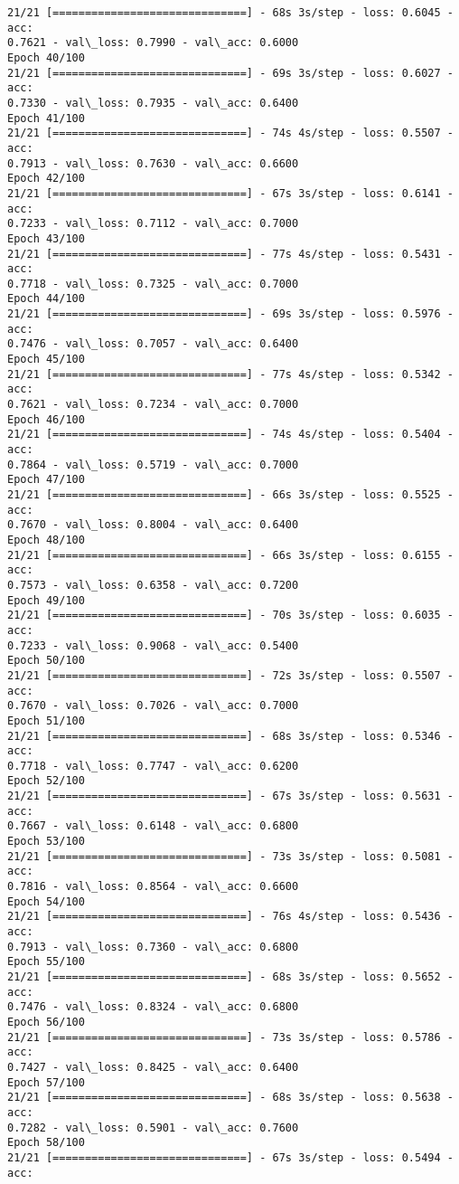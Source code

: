 \documentclass[11pt]{article}
\begin{document}
\begin{Verbatim}[commandchars=\\\{\}]
21/21 [==============================] - 68s 3s/step - loss: 0.6045 - acc:
0.7621 - val\_loss: 0.7990 - val\_acc: 0.6000
Epoch 40/100
21/21 [==============================] - 69s 3s/step - loss: 0.6027 - acc:
0.7330 - val\_loss: 0.7935 - val\_acc: 0.6400
Epoch 41/100
21/21 [==============================] - 74s 4s/step - loss: 0.5507 - acc:
0.7913 - val\_loss: 0.7630 - val\_acc: 0.6600
Epoch 42/100
21/21 [==============================] - 67s 3s/step - loss: 0.6141 - acc:
0.7233 - val\_loss: 0.7112 - val\_acc: 0.7000
Epoch 43/100
21/21 [==============================] - 77s 4s/step - loss: 0.5431 - acc:
0.7718 - val\_loss: 0.7325 - val\_acc: 0.7000
Epoch 44/100
21/21 [==============================] - 69s 3s/step - loss: 0.5976 - acc:
0.7476 - val\_loss: 0.7057 - val\_acc: 0.6400
Epoch 45/100
21/21 [==============================] - 77s 4s/step - loss: 0.5342 - acc:
0.7621 - val\_loss: 0.7234 - val\_acc: 0.7000
Epoch 46/100
21/21 [==============================] - 74s 4s/step - loss: 0.5404 - acc:
0.7864 - val\_loss: 0.5719 - val\_acc: 0.7000
Epoch 47/100
21/21 [==============================] - 66s 3s/step - loss: 0.5525 - acc:
0.7670 - val\_loss: 0.8004 - val\_acc: 0.6400
Epoch 48/100
21/21 [==============================] - 66s 3s/step - loss: 0.6155 - acc:
0.7573 - val\_loss: 0.6358 - val\_acc: 0.7200
Epoch 49/100
21/21 [==============================] - 70s 3s/step - loss: 0.6035 - acc:
0.7233 - val\_loss: 0.9068 - val\_acc: 0.5400
Epoch 50/100
21/21 [==============================] - 72s 3s/step - loss: 0.5507 - acc:
0.7670 - val\_loss: 0.7026 - val\_acc: 0.7000
Epoch 51/100
21/21 [==============================] - 68s 3s/step - loss: 0.5346 - acc:
0.7718 - val\_loss: 0.7747 - val\_acc: 0.6200
Epoch 52/100
21/21 [==============================] - 67s 3s/step - loss: 0.5631 - acc:
0.7667 - val\_loss: 0.6148 - val\_acc: 0.6800
Epoch 53/100
21/21 [==============================] - 73s 3s/step - loss: 0.5081 - acc:
0.7816 - val\_loss: 0.8564 - val\_acc: 0.6600
Epoch 54/100
21/21 [==============================] - 76s 4s/step - loss: 0.5436 - acc:
0.7913 - val\_loss: 0.7360 - val\_acc: 0.6800
Epoch 55/100
21/21 [==============================] - 68s 3s/step - loss: 0.5652 - acc:
0.7476 - val\_loss: 0.8324 - val\_acc: 0.6800
Epoch 56/100
21/21 [==============================] - 73s 3s/step - loss: 0.5786 - acc:
0.7427 - val\_loss: 0.8425 - val\_acc: 0.6400
Epoch 57/100
21/21 [==============================] - 68s 3s/step - loss: 0.5638 - acc:
0.7282 - val\_loss: 0.5901 - val\_acc: 0.7600
Epoch 58/100
21/21 [==============================] - 67s 3s/step - loss: 0.5494 - acc:

\end{Verbatim}
\end{document}
